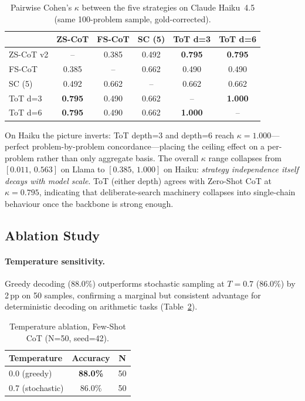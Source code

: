 ﻿\documentclass[runningheads]{llncs}
\begin{document}
\begin{table}[H]
\centering
\caption{Pairwise Cohen's $\kappa$ between the five strategies on
Claude Haiku~4.5 (same 100-problem sample, gold-corrected).}
\label{tab:kappa:haiku}
\begin{tabular}{@{}lccccc@{}}
\toprule
& \textbf{ZS-CoT} & \textbf{FS-CoT} & \textbf{SC (5)} &
\textbf{ToT d=3} & \textbf{ToT d=6} \\
\midrule
ZS-CoT v2  & --     & 0.385 & 0.492 & \textbf{0.795} & \textbf{0.795} \\
FS-CoT     & 0.385  & --    & 0.662 & 0.490 & 0.490 \\
SC (5)     & 0.492  & 0.662 & --    & 0.662 & 0.662 \\
ToT d=3    & \textbf{0.795} & 0.490 & 0.662 & --    & \textbf{1.000} \\
ToT d=6    & \textbf{0.795} & 0.490 & 0.662 & \textbf{1.000} & --    \\
\bottomrule
\end{tabular}
\end{table}

On Haiku the picture inverts: ToT depth=3 and depth=6 reach
$\kappa=1.000$---perfect problem-by-problem concordance---placing the
ceiling effect on a per-problem rather than only aggregate basis.
The overall $\kappa$ range collapses from $[0.011,\,0.563]$ on Llama
to $[0.385,\,1.000]$ on Haiku: \emph{strategy independence itself
decays with model scale}.
ToT (either depth) agrees with Zero-Shot CoT at $\kappa=0.795$,
indicating that deliberate-search machinery collapses into single-chain
behaviour once the backbone is strong enough.

\subsection{Ablation Study}

\paragraph{Temperature sensitivity.}
Greedy decoding (88.0\%) outperforms stochastic sampling at $T{=}0.7$
(86.0\%) by 2\,pp on 50 samples, confirming a marginal but consistent
advantage for deterministic decoding on arithmetic tasks
(Table~\ref{tab:temp}).

\begin{table}[H]
\centering
\caption{Temperature ablation, Few-Shot CoT (N=50, seed=42).}
\label{tab:temp}
\begin{tabular}{@{}lcc@{}}
\toprule
\textbf{Temperature} & \textbf{Accuracy} & \textbf{N} \\
\midrule
0.0 (greedy)     & \textbf{88.0\%} & 50 \\
0.7 (stochastic) & 86.0\%          & 50 \\
\bottomrule
\end{tabular}
\end{table}
\end{document}
